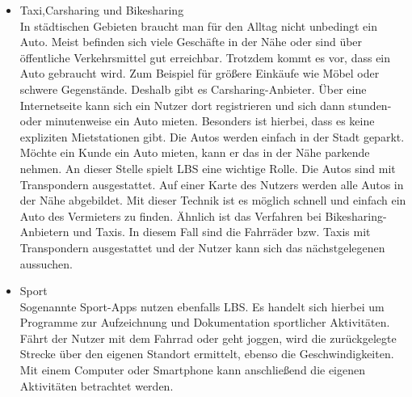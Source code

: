 \begin{itemize}
	
	\item Taxi,Carsharing und Bikesharing\\
	In städtischen Gebieten braucht man für den Alltag nicht unbedingt ein Auto. Meist befinden sich viele Geschäfte in der Nähe oder sind über öffentliche Verkehrsmittel gut erreichbar. Trotzdem kommt es vor, dass ein Auto gebraucht wird. Zum Beispiel für größere Einkäufe wie Möbel oder schwere Gegenstände. Deshalb gibt es Carsharing-Anbieter. Über eine Internetseite kann sich ein Nutzer dort registrieren und sich dann stunden- oder minutenweise ein Auto mieten. Besonders ist hierbei, dass es keine expliziten Mietstationen gibt. Die Autos werden einfach in der Stadt geparkt. Möchte ein Kunde ein Auto mieten, kann er das in der Nähe parkende nehmen. An dieser Stelle spielt LBS eine wichtige Rolle. Die Autos sind mit Transpondern ausgestattet. Auf einer Karte des Nutzers werden alle Autos in der Nähe abgebildet. Mit dieser Technik ist es möglich schnell und einfach ein Auto des Vermieters zu finden. Ähnlich ist das Verfahren bei Bikesharing-Anbietern und Taxis. In diesem Fall sind die Fahrräder bzw. Taxis mit Transpondern ausgestattet und der Nutzer kann sich das nächstgelegenen aussuchen.
	\item Sport\\
	Sogenannte Sport-Apps nutzen ebenfalls LBS. Es handelt sich hierbei um Programme zur Aufzeichnung und Dokumentation sportlicher Aktivitäten. Fährt der Nutzer mit dem Fahrrad oder geht joggen, wird die zurückgelegte Strecke über den eigenen Standort ermittelt, ebenso die Geschwindigkeiten. Mit einem Computer oder Smartphone kann anschließend die eigenen Aktivitäten betrachtet werden. 
\end{itemize}

